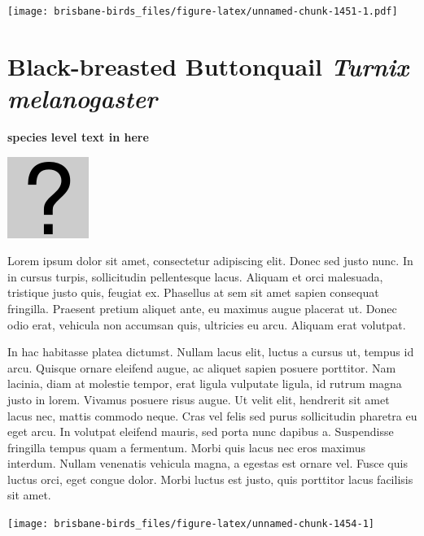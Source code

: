 \documentclass[]{book}
\let\origfigure\figure
\let\endorigfigure\endfigure
\renewenvironment{figure}[1][2] {
  \expandafter\origfigure\expandafter[H]
} {
  \endorigfigure
}
\begin{document}
\begin{figure}
\centering
\texttt{[image: brisbane-birds\_files/figure-latex/unnamed-chunk-1451-1.pdf]}
\caption{\label{fig:unnamed-chunk-1451}insert figure caption}
\end{figure}

\section{\texorpdfstring{Black-breasted Buttonquail \emph{Turnix
melanogaster}}{Black-breasted Buttonquail Turnix melanogaster}}\label{black-breasted-buttonquail-turnix-melanogaster}

\textbf{species level text in here}

\begin{figure}
\centering
\includegraphics{assets/missing.png}
\caption{No image for species}
\end{figure}

Lorem ipsum dolor sit amet, consectetur adipiscing elit. Donec sed justo
nunc. In in cursus turpis, sollicitudin pellentesque lacus. Aliquam et
orci malesuada, tristique justo quis, feugiat ex. Phasellus at sem sit
amet sapien consequat fringilla. Praesent pretium aliquet ante, eu
maximus augue placerat ut. Donec odio erat, vehicula non accumsan quis,
ultricies eu arcu. Aliquam erat volutpat.

In hac habitasse platea dictumst. Nullam lacus elit, luctus a cursus ut,
tempus id arcu. Quisque ornare eleifend augue, ac aliquet sapien posuere
porttitor. Nam lacinia, diam at molestie tempor, erat ligula vulputate
ligula, id rutrum magna justo in lorem. Vivamus posuere risus augue. Ut
velit elit, hendrerit sit amet lacus nec, mattis commodo neque. Cras vel
felis sed purus sollicitudin pharetra eu eget arcu. In volutpat eleifend
mauris, sed porta nunc dapibus a. Suspendisse fringilla tempus quam a
fermentum. Morbi quis lacus nec eros maximus interdum. Nullam venenatis
vehicula magna, a egestas est ornare vel. Fusce quis luctus orci, eget
congue dolor. Morbi luctus est justo, quis porttitor lacus facilisis sit
amet.

\begin{figure}
\texttt{[image: brisbane-birds\_files/figure-latex/unnamed-chunk-1454-1]} \caption{insert figure caption}\label{fig:unnamed-chunk-1454}
\end{figure}
\end{document}

